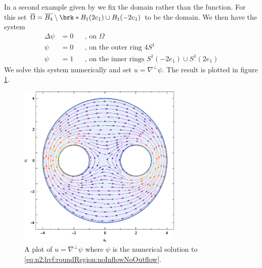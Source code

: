 In a second example given by \cite{Wahlen2023} we fix the domain rather than the function.
For this set $\overline{\Omega}=\overline{B_4}\setminus\brk*{B_1(2e_1)\cup B_1(-2e_1)}$ to be the domain.
We then have the system
\begin{equation}
  \begin{aligned}
    \Delta \psi&=0 &&\text{, on }\Omega \\
    \psi&=0 &&\text{, on the outer ring }4S^1 \\
    \psi&=1 &&\text{, on the inner rings }S^1(-2e_1)\cup S^1(2e_1)
  \end{aligned}\label{eq:n2:hvf:roundRegion:noInflowNoOutflow}
\end{equation}
We solve this system numerically and set $u=\nabla^\perp\psi$.
The result is plotted in figure \ref{pl:n2_hvf_roundRegion_noInflowNoOutflow}.
\begin{figure}
  \centering
  \includegraphics[width=0.7\textwidth]{../Plots/HarmonicVectorFields_gr4.eps}
  \caption{A plot of $u=\nabla^\perp\psi$ where $\psi$ is the numerical solution to
   \eqref{eq:n2:hvf:roundRegion:noInflowNoOutflow}.}
  \label{pl:n2_hvf_roundRegion_noInflowNoOutflow}
\end{figure}

